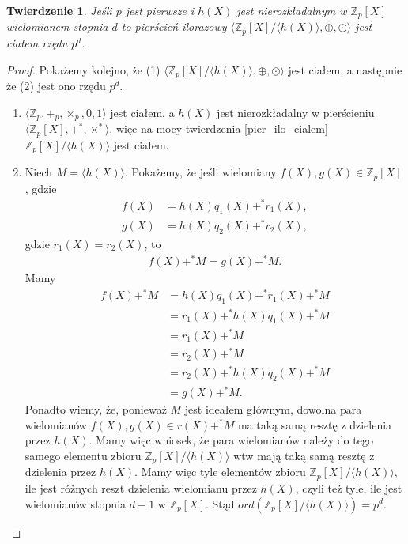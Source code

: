 \documentclass[polish,declaration,shortabstract]{iithesis}
\theoremstyle{definition}
\theoremstyle{remark} \newtheorem{observation}{Obserwacja}
\theoremstyle{plain} \newtheorem{theorem}{Twierdzenie}
\theoremstyle{plain} \newtheorem{lemma}{Lemat}
\theoremstyle{remark} \newtheorem*{remark*}{Uwaga}
\theoremstyle{reminder} \newtheorem*{reminder*}{Przypomnienie}
\begin{document}
\begin{theorem} \label{pier_ilo_ciałem}
	Jeśli $p$ jest pierwsze i $h(X)$ jest nierozkładalnym w $\mathbb{Z}_p[X]$ wielomianem stopnia $d$ to pierścień ilorazowy $\langle \mathbb{Z}_p[X]/\langle h(X) \rangle, \oplus, \odot \rangle$ jest ciałem rzędu $p^d$.
\end{theorem}

\begin{proof}
	Pokażemy kolejno, że (1) $\langle \mathbb{Z}_p[X]/\langle h(X) \rangle, \oplus, \odot \rangle$ jest ciałem, a następnie że (2) jest ono rzędu $p^d$.
	\begin{enumerate}[label=(\arabic*),leftmargin=.4in]
		\item $\langle \mathbb{Z}_p, +_p, \times_p, 0, 1 \rangle$ jest ciałem, a $h(X)$ jest nierozkładalny w pierścieniu $\langle \mathbb{Z}_p[X], +^*, \times^* \rangle$, więc na mocy twierdzenia \ref{pier_ilo_cialem} $\mathbb{Z}_p[X]/\langle h(X) \rangle$ jest ciałem.
		\item Niech $M = \langle h(X) \rangle$. Pokażemy, że jeśli wielomiany $f(X), g(X) \in \mathbb{Z}_p[X]$, gdzie 
		      \begin{align*}
		      	f(X) & = h(X)q_1(X) +^* r_1(X), \\
		      	g(X) & = h(X)q_2(X) +^* r_2(X), 
		      \end{align*}
		      gdzie $r_1(X) = r_2(X)$, to 
		      \begin{align*}
		      	f(X) +^* M = g(X) +^* M. 
		      \end{align*}
		      Mamy 
		      \begin{align*}
		      	f(X) +^* M & = h(X)q_1(X) +^* r_1(X) +^* M  \\
		      	           & = r_1(X) +^* h (X)q_1(X) +^* M \\
		      	           & = r_1(X) +^* M                 \\
		      	           & = r_2(X) +^* M                 \\
		      	           & = r_2(X) +^* h(X)q_2(X) +^* M  \\
		      	           & = g(X) +^* M.                  
		      \end{align*}
		      Ponadto wiemy, że, ponieważ $M$ jest ideałem głównym, dowolna para wielomianów $f(X), g(X) \in r(X) +^* M$ ma taką samą resztę z dzielenia przez $h(X)$. Mamy więc wniosek, że para wielomianów należy do tego samego elementu zbioru $\mathbb{Z}_p[X]/\langle h(X) \rangle$ wtw mają taką samą resztę z dzielenia przez $h(X)$.\newline
		      Mamy więc tyle elementów zbioru $\mathbb{Z}_p[X]/\langle h(X) \rangle$, ile jest różnych reszt dzielenia wielomianu przez $h(X)$, czyli też tyle, ile jest wielomianów stopnia $d-1$ w $\mathbb{Z}_p[X]$. Stąd $ord(\mathbb{Z}_p[X]/\langle h(X) \rangle) = p^d$.
	\end{enumerate}
\end{proof}
\end{document}
